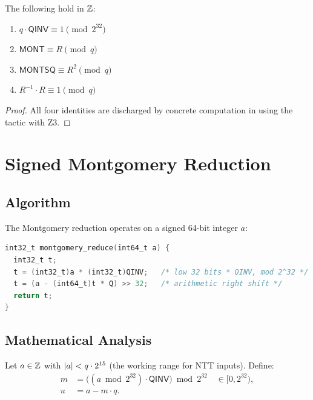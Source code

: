 \begin{lemma}
  The following hold in $\mathbb{Z}$:
  \begin{enumerate}
    \item $q \cdot \mathsf{QINV} \equiv 1 \pmod{2^{32}}$
    \item $\mathsf{MONT} \equiv R \pmod{q}$
    \item $\mathsf{MONTSQ} \equiv R^2 \pmod{q}$
    \item $R^{-1} \cdot R \equiv 1 \pmod{q}$
  \end{enumerate}
\label{lem:mont_params}
\end{lemma}

\begin{proof}
  All four identities are discharged by concrete computation in \easycrypt{}
  using the  tactic with Z3.
\end{proof}

\section{Signed Montgomery Reduction}

\subsection{Algorithm}

The \haetae{} Montgomery reduction operates on a signed 64-bit integer $a$:

\begin{lstlisting}[language=C,
  caption={Signed Montgomery reduction (C reference)},
  label={lst:mont_c}]
int32_t montgomery_reduce(int64_t a) {
  int32_t t;
  t = (int32_t)a * (int32_t)QINV;   /* low 32 bits * QINV, mod 2^32 */
  t = (a - (int64_t)t * Q) >> 32;   /* arithmetic right shift */
  return t;
}
\end{lstlisting}

\subsection{Mathematical Analysis}

Let $a \in \mathbb{Z}$ with $\left|a\right| < q \cdot 2^{15}$ (the working range for NTT
inputs).  Define:
\begin{align}
  m &= \bigl((a \bmod 2^{32}) \cdot \mathsf{QINV}\bigr) \bmod 2^{32}
        \quad \in [0, 2^{32}),
  \label{eq:mont_m} \\
  u &= a - m \cdot q.
  \label{eq:mont_u}
\end{align}

